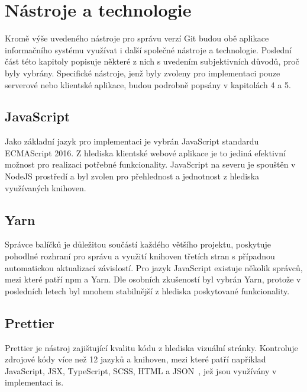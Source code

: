 

\section{Nástroje a technologie}

Kromě výše uvedeného nástroje pro správu verzí Git budou obě aplikace informačního systému využívat i další společné nástroje a technologie. Poslední část této kapitoly popisuje některé z nich s uvedením subjektivních důvodů, proč byly vybrány. Specifické nástroje, jenž byly zvoleny pro implementaci pouze serverové nebo klientské aplikace, budou podrobně popsány v kapitolách 4 a 5. 

\subsection{JavaScript}
Jako základní jazyk pro implementaci je vybrán JavaScript standardu ECMAScript 2016. Z hlediska klientské webové aplikace je to jediná efektivní možnost pro realizaci potřebné funkcionality. JavaScript na severu je spouštěn v NodeJS prostředí a byl zvolen pro přehlednost a jednotnost z hlediska využívaných knihoven.

\subsection{Yarn}
Správce balíčků je důležitou součástí každého většího projektu, poskytuje pohodlné rozhraní pro správu a využití knihoven třetích stran s případnou automatickou aktualizací závislostí. Pro jazyk JavaScript existuje několik správců, mezi které patří npm a Yarn. Dle osobních zkušeností byl vybrán Yarn, protože v posledních letech byl mnohem stabilnější z hlediska poskytované funkcionality.

\subsection{Prettier}
Prettier je nástroj zajištující kvalitu kódu z hlediska vizuální stránky. Kontroluje zdrojové kódy více než 12 jazyků a knihoven, mezi které patří například JavaScript, JSX, TypeScript, SCSS, HTML a JSON~\cite{prettier}, jež jsou využívány v implementaci \gls{is}.